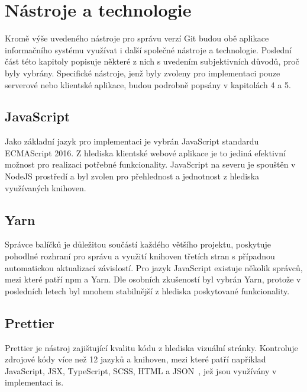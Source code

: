 

\section{Nástroje a technologie}

Kromě výše uvedeného nástroje pro správu verzí Git budou obě aplikace informačního systému využívat i další společné nástroje a technologie. Poslední část této kapitoly popisuje některé z nich s uvedením subjektivních důvodů, proč byly vybrány. Specifické nástroje, jenž byly zvoleny pro implementaci pouze serverové nebo klientské aplikace, budou podrobně popsány v kapitolách 4 a 5. 

\subsection{JavaScript}
Jako základní jazyk pro implementaci je vybrán JavaScript standardu ECMAScript 2016. Z hlediska klientské webové aplikace je to jediná efektivní možnost pro realizaci potřebné funkcionality. JavaScript na severu je spouštěn v NodeJS prostředí a byl zvolen pro přehlednost a jednotnost z hlediska využívaných knihoven.

\subsection{Yarn}
Správce balíčků je důležitou součástí každého většího projektu, poskytuje pohodlné rozhraní pro správu a využití knihoven třetích stran s případnou automatickou aktualizací závislostí. Pro jazyk JavaScript existuje několik správců, mezi které patří npm a Yarn. Dle osobních zkušeností byl vybrán Yarn, protože v posledních letech byl mnohem stabilnější z hlediska poskytované funkcionality.

\subsection{Prettier}
Prettier je nástroj zajištující kvalitu kódu z hlediska vizuální stránky. Kontroluje zdrojové kódy více než 12 jazyků a knihoven, mezi které patří například JavaScript, JSX, TypeScript, SCSS, HTML a JSON~\cite{prettier}, jež jsou využívány v implementaci \gls{is}.